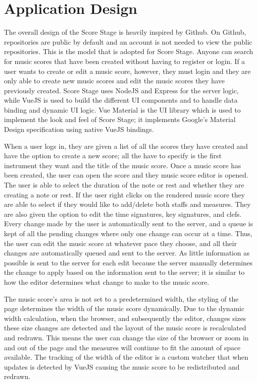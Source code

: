\documentclass[letterpaper,12pt]{article}
\begin{document}
\section{Application Design}

The overall design of the Score Stage is heavily inspired by Github. On Github, repositories are public by default and
an account is not needed to view the public repositories. This is the model that is adopted for Score Stage. Anyone can
search for music scores that have been created without having to register or login. If a user wants to create or edit
a music score, however, they must login and they are only able to create new music scores and edit the music scores they
have previously created. Score Stage uses NodeJS and Express for the server logic, while VueJS is used to build the
different UI components and to handle data binding and dynamic UI logic. Vue Material is the UI library which is used to
implement the look and feel of Score Stage; it implements Google's Material Design specification using native VueJS
bindings.

When a user logs in, they are given a list of all the scores they have created and have the option to create a new
score; all the have to specify is the first instrument they want and the title of the music score. Once a music score
has been created, the user can open the score and they music score editor is opened. The user is able to select the
duration of the note or rest and whether they are creating a note or rest. If the user right clicks on the rendered
music score they are able to select if they would like to add/delete both staffs and measures. They are also given the
option to edit the time signatures, key signatures, and clefs. Every change made by the user is automatically sent to
the server, and a queue is kept of all the pending changes where only one change can occur at a time. Thus, the user can
edit the music score at whatever pace they choose, and all their changes are automatically queued and sent to the
server. As little information as possible is sent to the server for each edit because the server manually determines the
change to apply based on the information sent to the server; it is similar to how the editor determines what change to
make to the music score.

The music score's area is not set to a predetermined width, the styling of the page determines the width of the music
score dynamically. Due to the dynamic width calculation, when the browser, and subsequently the editor, changes sizes
these size changes are detected and the layout of the music score is recalculated and redrawn. This means the user can
change the size of the browser or zoom in and out of the page and the measures will continue to fit the amount of space
available. The tracking of the width of the editor is a custom watcher that when updates is detected by VueJS causing
the music score to be redistributed and redrawn.
\end{document}
